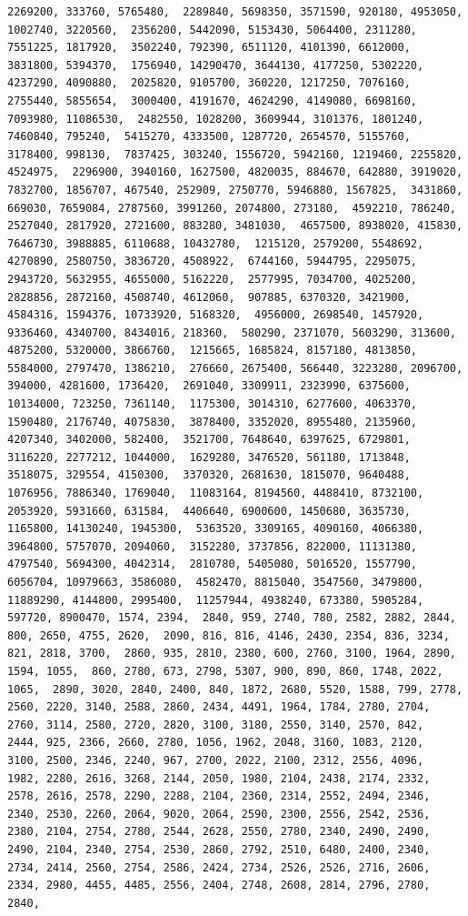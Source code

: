 \documentclass[
]{article}
\begin{document}
\begin{verbatim}
2269200, 333760, 5765480,  2289840, 5698350, 3571590, 920180, 4953050, 1002740, 3220560,  2356200, 5442090, 5153430, 5064400, 2311280, 7551225, 1817920,  3502240, 792390, 6511120, 4101390, 6612000, 3831800, 5394370,  1756940, 14290470, 3644130, 4177250, 5302220, 4237290, 4090880,  2025820, 9105700, 360220, 1217250, 7076160, 2755440, 5855654,  3000400, 4191670, 4624290, 4149080, 6698160, 7093980, 11086530,  2482550, 1028200, 3609944, 3101376, 1801240, 7460840, 795240,  5415270, 4333500, 1287720, 2654570, 5155760, 3178400, 998130,  7837425, 303240, 1556720, 5942160, 1219460, 2255820, 4524975,  2296900, 3940160, 1627500, 4820035, 884670, 642880, 3919020,  7832700, 1856707, 467540, 252909, 2750770, 5946880, 1567825,  3431860, 669030, 7659084, 2787560, 3991260, 2074800, 273180,  4592210, 786240, 2527040, 2817920, 2721600, 883280, 3481030,  4657500, 8938020, 415830, 7646730, 3988885, 6110688, 10432780,  1215120, 2579200, 5548692, 4270890, 2580750, 3836720, 4508922,  6744160, 5944795, 2295075, 2943720, 5632955, 4655000, 5162220,  2577995, 7034700, 4025200, 2828856, 2872160, 4508740, 4612060,  907885, 6370320, 3421900, 4584316, 1594376, 10733920, 5168320,  4956000, 2698540, 1457920, 9336460, 4340700, 8434016, 218360,  580290, 2371070, 5603290, 313600, 4875200, 5320000, 3866760,  1215665, 1685824, 8157180, 4813850, 5584000, 2797470, 1386210,  276660, 2675400, 566440, 3223280, 2096700, 394000, 4281600, 1736420,  2691040, 3309911, 2323990, 6375600, 10134000, 723250, 7361140,  1175300, 3014310, 6277600, 4063370, 1590480, 2176740, 4075830,  3878400, 3352020, 8955480, 2135960, 4207340, 3402000, 582400,  3521700, 7648640, 6397625, 6729801, 3116220, 2277212, 1044000,  1629280, 3476520, 561180, 1713848, 3518075, 329554, 4150300,  3370320, 2681630, 1815070, 9640488, 1076956, 7886340, 1769040,  11083164, 8194560, 4488410, 8732100, 2053920, 5931660, 631584,  4406640, 6900600, 1450680, 3635730, 1165800, 14130240, 1945300,  5363520, 3309165, 4090160, 4066380, 3964800, 5757070, 2094060,  3152280, 3737856, 822000, 11131380, 4797540, 5694300, 4042314,  2810780, 5405080, 5016520, 1557790, 6056704, 10979663, 3586080,  4582470, 8815040, 3547560, 3479800, 11889290, 4144800, 2995400,  11257944, 4938240, 673380, 5905284, 597720, 8900470, 1574, 2394,  2840, 959, 2740, 780, 2582, 2882, 2844, 800, 2650, 4755, 2620,  2090, 816, 816, 4146, 2430, 2354, 836, 3234, 821, 2818, 3700,  2860, 935, 2810, 2380, 600, 2760, 3100, 1964, 2890, 1594, 1055,  860, 2780, 673, 2798, 5307, 900, 890, 860, 1748, 2022, 1065,  2890, 3020, 2840, 2400, 840, 1872, 2680, 5520, 1588, 799, 2778,  2560, 2220, 3140, 2588, 2860, 2434, 4491, 1964, 1784, 2780, 2704,  2760, 3114, 2580, 2720, 2820, 3100, 3180, 2550, 3140, 2570, 842,  2444, 925, 2366, 2660, 2780, 1056, 1962, 2048, 3160, 1083, 2120,  3100, 2500, 2346, 2240, 967, 2700, 2022, 2100, 2312, 2556, 4096,  1982, 2280, 2616, 3268, 2144, 2050, 1980, 2104, 2438, 2174, 2332,  2578, 2616, 2578, 2290, 2288, 2104, 2360, 2314, 2552, 2494, 2346,  2340, 2530, 2260, 2064, 9020, 2064, 2590, 2300, 2556, 2542, 2536,  2380, 2104, 2754, 2780, 2544, 2628, 2550, 2780, 2340, 2490, 2490,  2490, 2104, 2340, 2754, 2530, 2860, 2792, 2510, 6480, 2400, 2340,  2734, 2414, 2560, 2754, 2586, 2424, 2734, 2526, 2526, 2716, 2606,  2334, 2980, 4455, 4485, 2556, 2404, 2748, 2608, 2814, 2796, 2780,  2840, 
\end{verbatim}
\end{document}
